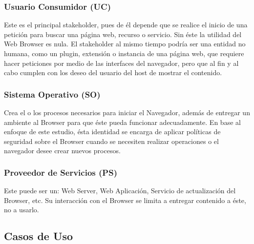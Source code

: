 		\subsubsection{Usuario Consumidor (UC)}
		Este es el principal stakeholder, pues de él depende que se realice el inicio de una petición para buscar una página web, recurso o servicio. Sin éste la utilidad del Web Browser es nula. El stakeholder al mismo tiempo podría ser una entidad no humana, como un plugin, extensión o instancia de una página web, que requiere hacer peticiones por medio de las interfaces del navegador, pero que al fin y al cabo cumplen con los deseo del usuario del host de mostrar el contenido.

		\subsubsection{Sistema Operativo (SO)}
		Crea el o los procesos necesarios para iniciar el Navegador, además de entregar un ambiente al Browser para que éste pueda funcionar adecuadamente. En base al enfoque de este estudio, ésta identidad se encarga de aplicar políticas de seguridad sobre el Browser cuando se necesiten realizar operaciones o el navegador desee crear nuevos procesos.

		\subsubsection{Proveedor de Servicios (PS)}
		Este puede ser un: Web Server, Web Aplicación, Servicio de actualización del Browser, etc. Su interacción con el Browser se limita a entregar contenido a éste, no a usarlo.

	\subsection{Casos de Uso}
